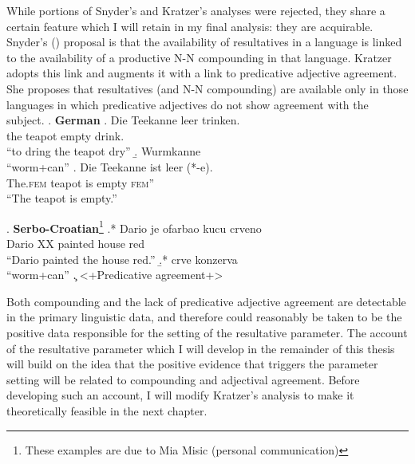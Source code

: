 \documentclass[MilwayThesis]{subfiles}
\begin{document}
While portions of Snyder's and Kratzer's analyses were rejected, they share a certain feature which I will retain in my final analysis: they are acquirable.
Snyder's (\citeyear{snyder1995language}) proposal is that the availability of resultatives in a language is linked to the availability of a productive N-N compounding in that language.
Kratzer adopts this link and augments it with a link to predicative adjective agreement.
She proposes that resultatives (and N-N compounding) are available only in those languages in which predicative adjectives do not show agreement with the subject.
\ex. \textbf{German}
\ag. Die Teekanne leer trinken.\\
the teapot empty drink.\\
``to dring the teapot dry'' \parencite{kratzer2004building}
\b. Wurmkanne\\
``worm+can'' \parencite{snyder2001nature}
\cg. Die Teekanne ist leer (*-e).\\
The.\textsc{fem} teapot is empty \textsc{fem}''\\
``The teapot is empty.''

\ex. \textbf{Serbo-Croatian}\footnote{These examples are due to Mia Misic (personal communication)} 
\ag.* Dario je ofarbao kucu crveno\\
Dario XX painted house red\\
``Dario painted the house red.''
\b.* crve konzerva\\
``worm+can''
\c. <+Predicative agreement+>

Both compounding and the lack of predicative adjective agreement are detectable in the primary linguistic data, and therefore could reasonably be taken to be the positive data responsible for the setting of the resultative parameter.
The account of the resultative parameter which I will develop in the remainder of this thesis will build on the idea that the positive evidence that triggers the parameter setting will be related to compounding and adjectival agreement.
Before developing such an account, I will modify Kratzer's analysis to make it theoretically feasible in the next chapter.
\end{document}
